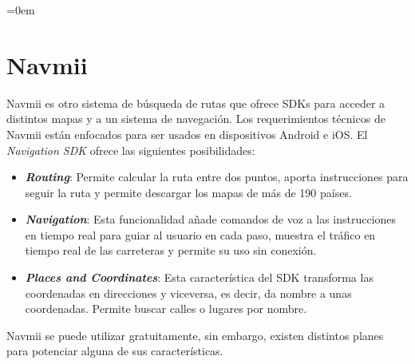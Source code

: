 \parindent=0em
\section{Navmii}
\noindent


Navmii es otro sistema de búsqueda de rutas que ofrece SDKs para acceder a distintos mapas y a un sistema de navegación. Los requerimientos técnicos de Navmii están enfocados para ser usados en dispositivos Android e iOS. El \textit{Navigation SDK} ofrece las siguientes posibilidades:

\begin{itemize}
    \item \textit{\textbf{Routing}}: Permite calcular la ruta entre dos puntos, aporta instrucciones para seguir la ruta  y permite descargar los mapas de más de 190 países.
    
    \item \textit{\textbf{Navigation}}: Esta funcionalidad añade comandos de voz a las instrucciones en tiempo real para guiar al usuario en cada paso, muestra el tráfico en tiempo real de las carreteras y permite su uso sin conexión. 
    
    \item \textit{\textbf{Places and Coordinates}}: Esta característica del SDK transforma las coordenadas en direcciones y viceversa, es decir, da nombre a unas coordenadas. Permite buscar calles o lugares por nombre.
\end{itemize}

Navmii se puede utilizar gratuitamente, sin embargo, existen distintos planes para potenciar alguna de sus características.